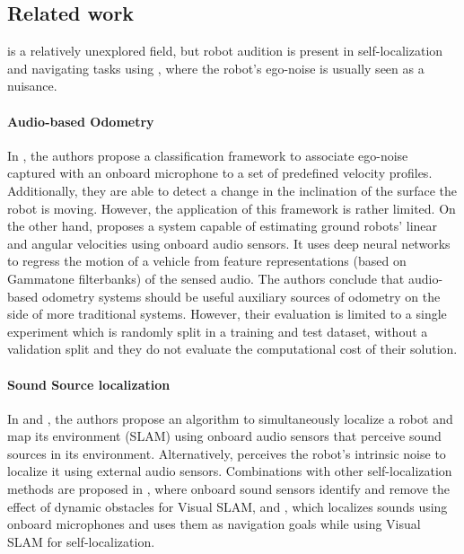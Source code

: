 \subsection{Related work} \label{sec:related-work}

 is a relatively unexplored field, but robot
audition is present in self-localization and navigating tasks using
, where the robot's ego-noise is
usually seen as a nuisance. 


\paragraph{Audio-based Odometry} \label{para:audio-based-odometry} In
\cite{HowDoISoundLike}, the authors propose a classification framework to
associate ego-noise captured with an onboard microphone to a set of predefined
velocity profiles. Additionally, they are able to detect a change in the
inclination of the surface the robot is moving. However, the application of
this framework is rather limited. On the other hand, \cite{marchegiani2018a}
proposes a system capable of estimating ground robots' linear and angular
velocities using onboard audio sensors. It uses deep neural networks to regress
the motion of a vehicle from feature representations (based on Gammatone
filterbanks) of the sensed audio. The authors conclude that audio-based
odometry systems should be useful auxiliary sources of odometry on the side of
more traditional systems. However, their evaluation is limited to a single
experiment which is randomly split in a training and test dataset, without a
validation split and they do not evaluate the computational cost of their
solution.

\paragraph{Sound Source localization} \label{para:sound-source-localization} In
\cite{AcousticSLAM} and \cite{SoundSourceMapping}, the authors propose an
algorithm to simultaneously localize a robot and map its environment (SLAM)
using onboard audio sensors that perceive sound sources in its environment.
Alternatively, \cite{Allen2012} perceives the robot's intrinsic noise to
localize it using external audio sensors. Combinations with other
self-localization methods are proposed in \cite{AcousticFusion}, where onboard
sound sensors identify and remove the effect of dynamic obstacles for Visual
SLAM, and \cite{Gautam2014}, which localizes sounds using onboard microphones
and uses them as navigation goals while using Visual SLAM for
self-localization.

